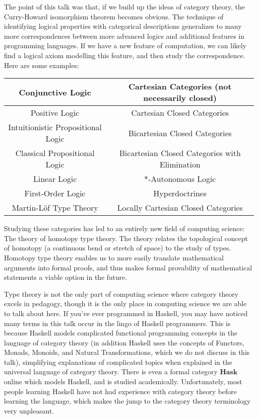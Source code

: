 \documentclass{article}
\theoremstyle{plain}
\begin{document}
The point of this talk was that, if we build up the ideas of category theory, the Curry-Howard isomorphism theorem becomes obvious. The technique of identifying logical properties with categorical descriptions generalizes to many more correspondences between more advanced logics and additional features in programming languages. If we have a new feature of computation, we can likely find a logical axiom modelling this feature, and then study the correspondence. Here are some examples:
%
\begin{center}
\begin{tabular}{ | c | c | }
    \hline
    Conjunctive Logic & Cartesian Categories (not necessarily closed)\\
    \hline
    Positive Logic & Cartesian Closed Categories\\
    Intuitionistic Propositional Logic & Bicartesian Closed Categories\\
    \hline
    Classical Propositional Logic & Bicartesian Closed Categories with Elimination\\
    \hline
    Linear Logic & $*$-Autonomous Logic\\
    \hline
    First-Order Logic & Hyperdoctrines\\
    \hline
    Martin-L\"{o}f Type Theory & Locally Cartesian Closed Categories\\
    \hline
\end{tabular}
\end{center}
%
Studying these categories has led to an entirely new field of computing science: The theory of homotopy type theory. The theory relates the topological concept of homotopy (a continuous bend or stretch of space) to the study of types. Homotopy type theory enables us to more easily translate mathematical arguments into formal proofs, and thus makes formal provability of mathematical statements a viable option in the future.

Type theory is not the only part of computing science where category theory excels in pedagogy, though it is the only place in computing science we are able to talk about here. If you've ever programmed in Haskell, you may have noticed many terms in this talk occur in the lingo of Haskell programmers. This is because Haskell models complicated functional programming concepts in the language of category theory (in addition Haskell uses the concepts of Functors, Monads, Monoids, and Natural Transformations, which we do not discuss in this talk), simplifying explanations of complicated topics when explained in the universal language of category theory. There is even a formal category $\mathbf{Hask}$ online which models Haskell, and is studied academically. Unfortunately, most people learning Haskell have not had experience with category theory before learning the language, which makes the jump to the category theory terminology very unpleasant.
\end{document}
